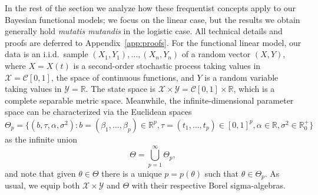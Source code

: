 \documentclass{article}
\numberwithin{equation}{section}
\theoremstyle{plain}
\theoremstyle{definition}
\newcommand{\R}{\mathbb{R}}
\begin{document}
In the rest of the section we analyze how these frequentist concepts apply to our Bayesian functional models; we focus on the linear case, but the results we obtain generally hold \textit{mutatis mutandis} in the logistic case. All technical details and proofs are deferred to Appendix~\ref{app:proofs}. For the functional linear model, our data is an i.i.d.\ sample \((X_1, Y_1), \ldots, (X_n, Y_n)\) of a random vector \((X,Y)\), where \(X=X(t)\) is a second-order stochastic process taking values in \(\mathcal X=\mathcal C[0,1]\), the space of continuous functions, and \(Y\) is a random variable taking values in \(\mathcal Y=\R\). The state space is \(\mathcal X \times \mathcal Y = \mathcal C[0,1]\times \R\), which is a complete separable metric space. Meanwhile, the infinite-dimensional parameter space can be characterized via the Euclidean spaces \(\Theta_p = \{(b, \tau, \alpha, \sigma^2): b=(\beta_1,\dots,\beta_p) \in \R^p, \tau=(t_1,\dots,t_p) \in [0,1]^p, \alpha\in \R, \sigma^2 \in \R^+_0\}\) as the infinite union
\begin{equation}\label{eq:parameter-space-union}
  \Theta = \bigcup_{p=1}^\infty \Theta_p,
\end{equation}
and note that given \(\theta \in \Theta\) there is a unique \(p=p(\theta)\) such that \(\theta \in \Theta_p\). As usual, we equip both \(\mathcal X \times \mathcal Y\) and \(\Theta\) with their respective Borel sigma-algebras.
\end{document}
